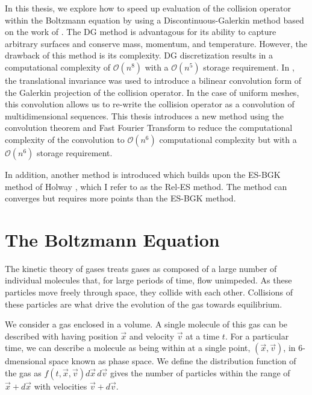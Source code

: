 \documentclass[12pt]{CSUNthesis}
\begin{document}
In this thesis, we explore how to speed up evaluation of the collision operator within the Boltzmann equation by using a Discontinuous-Galerkin method based on the work of \cite{Majorana2011,AlekseenkoJosyula2012,AlekseenkoJosyula2012a}. The DG method is advantagous for its ability to capture arbitrary surfaces and conserve mass, momentum, and temperature. However, the drawback of this method is its complexity. DG discretization results in a computational complexity of $\mathcal{O}(n^8)$ with a $\mathcal{O}(n^5)$ storage requirement. In \cite{AlekseenkoNguyenWood2015}, the translational invariance was used to introduce a bilinear convolution form of the Galerkin projection of the collision operator. In the case of uniform meshes, this convolution allows us to re-write the collision operator as a convolution of multidimensional sequences. This thesis introduces a new method using the convolution theorem and Fast Fourier Transform to reduce the computational complexity of the convolution to $\mathcal{O}(n^6)$ computational complexity but with a $\mathcal{O}(n^6)$ storage requirement.

In addition, another method is introduced which builds upon the ES-BGK method of Holway \cite{H66}, which I refer to as the Rel-ES method. The method can converges but requires more points than the ES-BGK method. 

\chapter{The Boltzmann Equation}
\label{Chap2}

	The kinetic theory of gases treats gases as composed of a large number of individual molecules that, for large periods of time, flow unimpeded. As these particles move freely through space, they collide with each other. Collisions of these particles are what drive the evolution of the gas towards equilibrium.
	
	We consider a gas enclosed in a volume. A single molecule of this gas can be described with having position $\vec{x}$ and velocity $\vec{v}$ at a time $t$. For a particular time, we can describe a molecule as being within at a single point, $(\vec{x},\vec{v})$, in 6-dmensional space known as phase space. We define the distribution function of the gas as $f(t,\vec{x},\vec{v})d\vec{x}\,d\vec{v}$ gives the number of particles within the range of $\vec{x} + d\vec{x}$ with velocities $\vec{v} + d\vec{v}$. 
\end{document}
